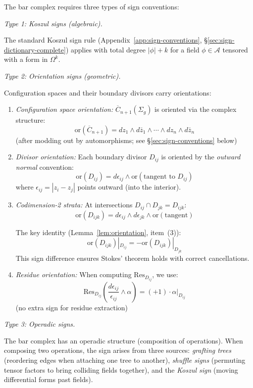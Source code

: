 \begin{convention}\label{conv:orientations-enhanced}
The bar complex requires three types of sign conventions:

\emph{Type 1: Koszul signs (algebraic).}

The standard Koszul sign rule (Appendix~\ref{app:sign-conventions}, \S\ref{sec:sign-dictionary-complete}) applies with total degree $|\phi| + k$ for a field $\phi \in \mathcal{A}$ tensored with a form in $\Omega^k$.

\emph{Type 2: Orientation signs (geometric).}

Configuration spaces and their boundary divisors carry orientations:

\begin{enumerate}
\item \emph{Configuration space orientation:} $\overline{C}_{n+1}(\Sigma_g)$ is oriented via the complex structure:
\[\text{or}(\overline{C}_{n+1}) = dz_1 \wedge d\bar{z}_1 \wedge \cdots \wedge dz_n \wedge d\bar{z}_n\]
(after modding out by automorphisms; see \S\ref{sec:sign-conventions} below)

\item \emph{Divisor orientation:} Each boundary divisor $D_{ij}$ is oriented by the \emph{outward normal} convention:
\[\text{or}(D_{ij}) = d\epsilon_{ij} \wedge \text{or}(\text{tangent to } D_{ij})\]
where $\epsilon_{ij} = |z_i - z_j|$ points outward (into the interior).

\item \emph{Codimension-2 strata:} At intersections $D_{ij} \cap D_{jk} = D_{ijk}$:
\[\text{or}(D_{ijk}) = d\epsilon_{ij} \wedge d\epsilon_{jk} \wedge \text{or}(\text{tangent})\]

The key identity (Lemma~\ref{lem:orientation}, item~(3)):
\[\text{or}(D_{ijk})|_{D_{ij}} = -\text{or}(D_{ijk})|_{D_{jk}}\]
This sign difference ensures Stokes' theorem holds with correct cancellations.

\item \emph{Residue orientation:} When computing $\text{Res}_{D_{ij}}$, we use:
\[\text{Res}_{D_{ij}}\left(\frac{d\epsilon_{ij}}{\epsilon_{ij}} \wedge \alpha\right) = (+1) \cdot \alpha|_{D_{ij}}\]
(no extra sign for residue extraction)
\end{enumerate}

\emph{Type 3: Operadic signs.}

The bar complex has an operadic structure (composition of operations). When composing two operations, the sign arises from three sources: \emph{grafting trees} (reordering edges when attaching one tree to another), \emph{shuffle signs} (permuting tensor factors to bring colliding fields together), and the \emph{Koszul sign} (moving differential forms past fields).


\end{convention}
